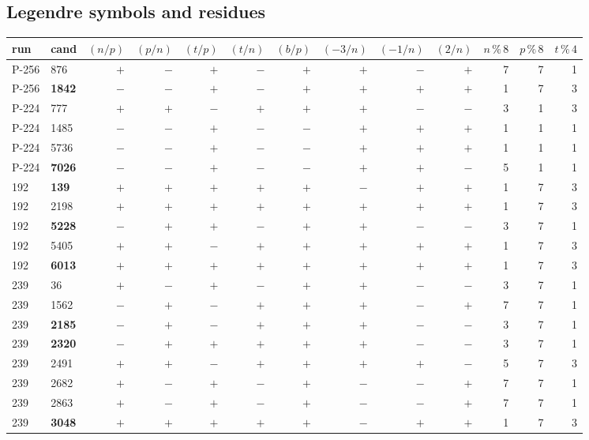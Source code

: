 \subsection{Legendre symbols and residues}
\begin{center}\scriptsize
\begin{tabular}{llrrrrrrrrrrr}
\toprule
run & cand & $(n/p)$ & $(p/n)$ & $(t/p)$ & $(t/n)$ & $(b/p)$ & $(-3/n)$ & $(-1/n)$ & $(2/n)$ & $n\,\%\,8$ & $p\,\%\,8$ & $t\,\%\,4$ \\
\midrule
P-256 & 876 & $+$ & $-$ & $+$ & $-$ & $+$ & $+$ & $-$ & $+$ & 7 & 7 & 1 \\
P-256 & \textbf{1842} & $-$ & $-$ & $+$ & $-$ & $+$ & $+$ & $+$ & $+$ & 1 & 7 & 3 \\
P-224 & 777 & $+$ & $+$ & $-$ & $+$ & $+$ & $+$ & $-$ & $-$ & 3 & 1 & 3 \\
P-224 & 1485 & $-$ & $-$ & $+$ & $-$ & $-$ & $+$ & $+$ & $+$ & 1 & 1 & 1 \\
P-224 & 5736 & $-$ & $-$ & $+$ & $-$ & $-$ & $+$ & $+$ & $+$ & 1 & 1 & 1 \\
P-224 & \textbf{7026} & $-$ & $-$ & $+$ & $-$ & $-$ & $+$ & $+$ & $-$ & 5 & 1 & 1 \\
192 & \textbf{139} & $+$ & $+$ & $+$ & $+$ & $+$ & $-$ & $+$ & $+$ & 1 & 7 & 3 \\
192 & 2198 & $+$ & $+$ & $+$ & $+$ & $+$ & $+$ & $+$ & $+$ & 1 & 7 & 3 \\
192 & \textbf{5228} & $-$ & $+$ & $+$ & $-$ & $+$ & $+$ & $-$ & $-$ & 3 & 7 & 1 \\
192 & 5405 & $+$ & $+$ & $-$ & $+$ & $+$ & $+$ & $+$ & $+$ & 1 & 7 & 3 \\
192 & \textbf{6013} & $+$ & $+$ & $+$ & $+$ & $+$ & $+$ & $+$ & $+$ & 1 & 7 & 3 \\
239 & 36 & $+$ & $-$ & $+$ & $-$ & $+$ & $+$ & $-$ & $-$ & 3 & 7 & 1 \\
239 & 1562 & $-$ & $+$ & $-$ & $+$ & $+$ & $+$ & $-$ & $+$ & 7 & 7 & 1 \\
239 & \textbf{2185} & $-$ & $+$ & $-$ & $+$ & $+$ & $+$ & $-$ & $-$ & 3 & 7 & 1 \\
239 & \textbf{2320} & $-$ & $+$ & $+$ & $+$ & $+$ & $+$ & $-$ & $-$ & 3 & 7 & 1 \\
239 & 2491 & $+$ & $+$ & $-$ & $+$ & $+$ & $+$ & $+$ & $-$ & 5 & 7 & 3 \\
239 & 2682 & $+$ & $-$ & $+$ & $-$ & $+$ & $-$ & $-$ & $+$ & 7 & 7 & 1 \\
239 & 2863 & $+$ & $-$ & $+$ & $-$ & $+$ & $-$ & $-$ & $+$ & 7 & 7 & 1 \\
239 & \textbf{3048} & $+$ & $+$ & $+$ & $+$ & $+$ & $-$ & $+$ & $+$ & 1 & 7 & 3 \\
\bottomrule
\end{tabular}
\end{center}

